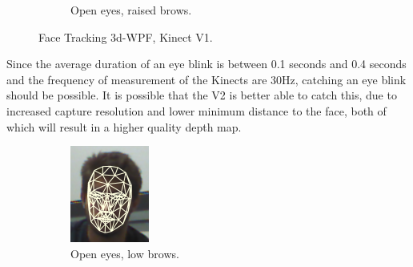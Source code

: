 \begin{figure}[H]
\begin{subfigure}{.3\textwidth}
		\caption{Open eyes, raised brows.}\label{[KINECT][TEXTURED] Open eyes, raised brows}
	\end{subfigure}
	\caption{Face Tracking 3d-WPF, Kinect V1.}
	\label{[KINECT][TEXTURED] Textured captures.}
\end{figure}

Since the average duration of an eye blink is between 0.1 seconds and 0.4 seconds\cite{eye_blink_duration} and the frequency of measurement of the Kinects are 30Hz, catching an eye blink should be possible.
It is possible that the V2 is better able to catch this, due to increased capture resolution and lower minimum distance to the face, both of which will result in a higher quality depth map.

\begin{figure}[H]
	\centering
	\begin{subfigure}{.3\textwidth}
		\centering
		\includegraphics[width=0.8\linewidth]{sections/analysis/sensorselection/kinect/poly_noface}
		\caption{Open eyes, low brows.}\label{[KINECT][WIREFRAME] Open eyes, low brows}
	\end{subfigure}\hfill
	\begin{subfigure}{.3\textwidth}
		\centering

\end{subfigure}
\end{figure}
